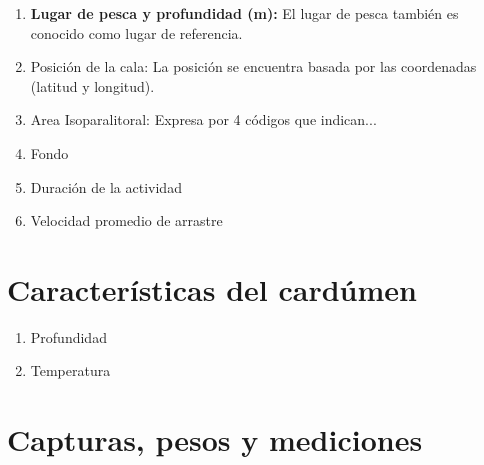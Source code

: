 \documentclass[a4paper,oneside,11pt]{book}
\begin{document}
\begin{enumerate}

\item \textbf{Lugar de pesca y profundidad (m):} El lugar de pesca también es conocido como lugar de referencia.
\item Posición de la cala: La posición se encuentra basada por las coordenadas (latitud y longitud).
\item Area Isoparalitoral: Expresa por 4 códigos que indican...

\item Fondo
\item Duración de la actividad 
\item Velocidad promedio de arrastre
\end{enumerate}


\section{Características del cardúmen}

 \begin{figure} [!h]
  \begin{center}
   \end{center}
   \end{figure}

\begin{enumerate}
\item Profundidad
\item Temperatura
\end{enumerate}



\section{Capturas, pesos y mediciones}
\end{document}
